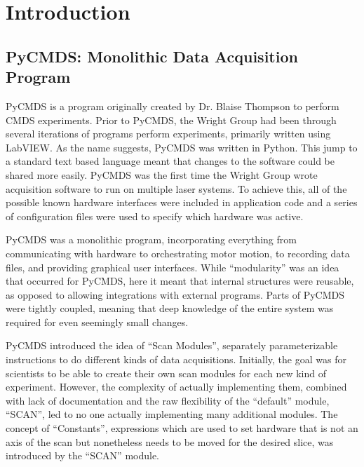  \label{cha:acq}

\newcommand\biab{\texttt{bluesky-in-a-box} }
\newcommand\wrightfakes{\texttt{wright-fakes} }
\newcommand\wrightplans{\texttt{wright-plans} }
\newcommand\blueskycmds{\texttt{bluesky-cmds} }
\newcommand\yaqccmds{\texttt{yaqc-cmds}}
\newcommand\yaqcbluesky{\texttt{yaqc-bluesky}}

\clearpage

\section{Introduction}

\subsection{PyCMDS: Monolithic Data Acquisition Program}


\Gls{PyCMDS} is a program originally created by Dr. Blaise Thompson to perform \gls{CMDS} experiments\cite{PyCMDS0.8.0}.
Prior to PyCMDS, the Wright Group had been through several iterations of programs perform experiments, primarily written using LabVIEW\cite{KainSchuyler2017a}\cite{MeyerKentAlbert2004b}.
As the name suggests, PyCMDS was written in Python.
This jump to a standard text based language meant that changes to the software could be shared more easily.
PyCMDS was the first time the Wright Group wrote acquisition software to run on multiple laser systems.
To achieve this, all of the possible known hardware interfaces were included in application code and a series of configuration files were used to specify which hardware was active.

PyCMDS was a monolithic program, incorporating everything from communicating with hardware to orchestrating motor motion, to recording data files, and providing graphical user interfaces.
While ``modularity'' was an idea that occurred for PyCMDS, here it meant that internal structures were reusable, as opposed to allowing integrations with external programs.
Parts of PyCMDS were tightly coupled, meaning that deep knowledge of the entire system was required for even seemingly small changes.

PyCMDS introduced the idea of ``Scan Modules'', separately parameterizable instructions to do different kinds of data acquisitions.
Initially, the goal was for scientists to be able to create their own scan modules for each new kind of experiment.
However, the complexity of actually implementing them, combined with lack of documentation and the raw flexibility of the ``default'' module, ``SCAN'', led to no one actually implementing many additional modules.
The concept of ``Constants'', expressions which are used to set hardware that is not an axis of the scan but nonetheless needs to be moved for the desired slice, was introduced by the ``SCAN'' module.

